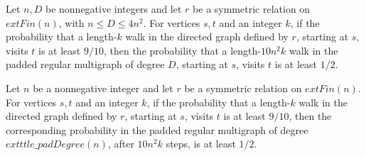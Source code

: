 \begin{theorem}
\label{Randomized.half_le_hitProb_padGraph}
\leanok
{}
Let $n,D$ be nonnegative integers and let $r$ be a symmetric relation on $	ext{Fin}(n)$,
with $n\le D\le 4n^2$. For vertices $s,t$ and an integer $k$, if the probability that a
length-$k$ walk in the directed graph defined by $r$, starting at $s$, visits $t$ is at
least $9/10$, then the probability that a length-$10n^2k$ walk in the padded regular
multigraph of degree $D$, starting at $s$, visits $t$ is at least $1/2$.
\end{theorem}

\begin{theorem}
\label{Randomized.half_le_hitProb_padDegree}
\leanok
{}
Let $n$ be a nonnegative integer and let $r$ be a symmetric relation on $	ext{Fin}(n)$.
For vertices $s,t$ and an integer $k$, if the probability that a length-$k$ walk in the
directed graph defined by $r$, starting at $s$, visits $t$ is at least $9/10$, then the
corresponding probability in the padded regular multigraph of degree
$	exttt{le\_padDegree}(n)$, after $10n^2k$ steps, is at least $1/2$.
\end{theorem}
